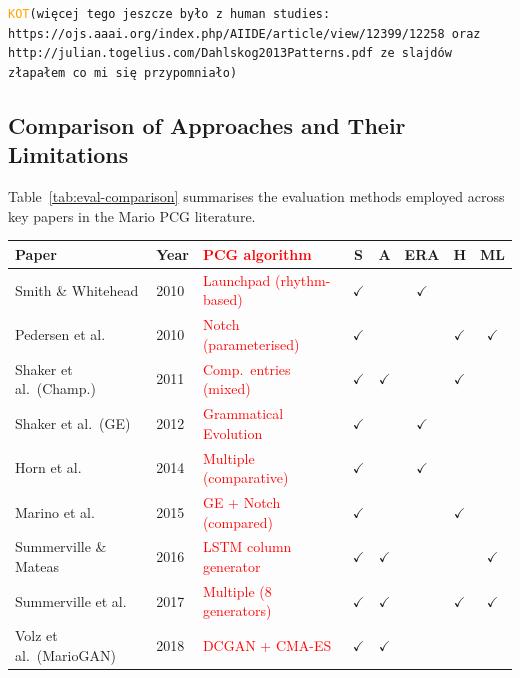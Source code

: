 \documentclass[shortabstract, mgr, english]{iithesis}
\newcommand{\DEBUG}[1]{{#1}} %
\newcommand{\KOT}[1]{\DEBUG{\tt{\textcolor{orange}{KOT}(}{#1}{)}}}
\newcommand{\changed}[1]{\textcolor{red}{#1}}
\begin{document}
\KOT{więcej tego jeszcze było z human studies: https://ojs.aaai.org/index.php/AIIDE/article/view/12399/12258 oraz http://julian.togelius.com/Dahlskog2013Patterns.pdf  ze slajdów złapałem co mi się przypomniało}

\subsection{Comparison of Approaches and Their Limitations}
\label{subsec:bg-eval-comparison}

Table~\ref{tab:eval-comparison} summarises the evaluation methods employed across
key papers in the Mario PCG literature.

\begin{table}[H]
\centering
\small
\begin{tabular}{lllccccc}
\toprule
\textbf{Paper} & \textbf{Year} & \changed{\textbf{PCG algorithm}} & \textbf{S} & \textbf{A} & \textbf{ERA} & \textbf{H} & \textbf{ML} \\
\midrule
Smith \& Whitehead          & 2010 & \changed{Launchpad (rhythm-based)} & $\checkmark$ &              & $\checkmark$ &              &              \\
Pedersen et al.             & 2010 & \changed{Notch (parameterised)}   & $\checkmark$ &              &              & $\checkmark$ & $\checkmark$ \\
Shaker et al.\ (Champ.)     & 2011 & \changed{Comp.\ entries (mixed)}  & $\checkmark$ & $\checkmark$ &              & $\checkmark$ &              \\
Shaker et al.\ (GE)         & 2012 & \changed{Grammatical Evolution}   & $\checkmark$ &              & $\checkmark$ &              &              \\
Horn et al.                 & 2014 & \changed{Multiple (comparative)}  & $\checkmark$ &              & $\checkmark$ &              &              \\
Marino et al.               & 2015 & \changed{GE + Notch (compared)}   & $\checkmark$ &              &              & $\checkmark$ &              \\
Summerville \& Mateas       & 2016 & \changed{LSTM column generator}   & $\checkmark$ & $\checkmark$ &              &              & $\checkmark$ \\
Summerville et al.          & 2017 & \changed{Multiple (8 generators)} & $\checkmark$ & $\checkmark$ &              & $\checkmark$ & $\checkmark$ \\
Volz et al.\ (MarioGAN)     & 2018 & \changed{DCGAN + CMA-ES}          & $\checkmark$ & $\checkmark$ &              &              &              \\

\end{tabular}
\end{table}
\end{document}
